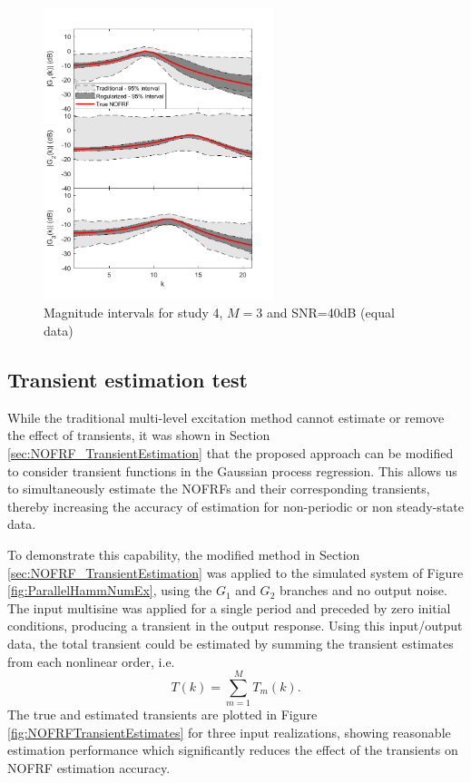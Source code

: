 \begin{figure}[!hp]
\centering
\includegraphics[width=0.6\textwidth]{Chapter7_NOFRFs/Hamm3rdOrder_SNR100_10timesN128_DiscreteTime.pdf}
\caption{Magnitude intervals for study 4, $M=3$ and SNR=40dB (equal data)}
\label{fig:NOFRFs_3rdOrder_SNR100_10times}
\end{figure}

\subsection{Transient estimation test}

While the traditional multi-level excitation method cannot estimate or remove the effect of transients, it was shown in Section \ref{sec:NOFRF_TransientEstimation} that the proposed approach can be modified to consider transient functions in the Gaussian process regression. This allows us to simultaneously estimate the NOFRFs and their corresponding transients, thereby increasing the accuracy of estimation for non-periodic or non steady-state data. 

To demonstrate this capability, the modified method in Section \ref{sec:NOFRF_TransientEstimation} was applied to the simulated system of Figure \ref{fig:ParallelHammNumEx}, using the $G_1$ and $G_2$ branches and no output noise. The input multisine was applied for a single period and preceded by zero initial conditions, producing a transient in the output response. Using this input/output data, the total transient could be estimated by summing the transient estimates from each nonlinear order, i.e.
\begin{equation}
T(k) = \sum_{m=1}^{M} T_m(k).
\end{equation}
The true and estimated transients are plotted in Figure \ref{fig:NOFRFTransientEstimates} for three input realizations, showing reasonable estimation performance which significantly reduces the effect of the transients on NOFRF estimation accuracy. 

